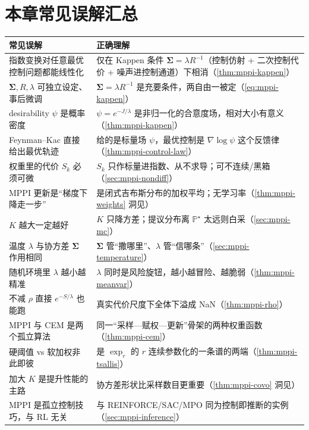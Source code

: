 \section*{本章常见误解汇总}
\begin{table}[H]\centering\small
\begin{tabular}{p{} p{}}
\toprule
\textbf{常见误解} & \textbf{正确理解} \\
\midrule
指数变换对任意最优控制问题都能线性化 & 仅在 Kappen 条件 $\boldsymbol{\Sigma}=\lambda R^{-1}$（控制仿射 + 二次控制代价 + 噪声进控制通道）下相消（\cref{thm:mppi-kappen}）\\
$\boldsymbol{\Sigma},R,\lambda$ 可独立设定、事后微调 & $\boldsymbol{\Sigma}=\lambda R^{-1}$ 是充要条件，两自由一被定（\cref{eq:mppi-kappen}）\\
desirability $\psi$ 是概率密度 & $\psi=e^{-J/\lambda}$ 是非归一化的合意度场，相对大小有意义（\cref{thm:mppi-kappen}）\\
Feynman--Kac 直接给出最优轨迹 & 给的是标量场 $\psi$，最优控制是 $\nabla\log\psi$ 这个反馈律（\cref{thm:mppi-control-law}）\\
权重里的代价 $S_k$ 必须可微 & $S_k$ 只作标量进指数、从不求导；可不连续/黑箱（\cref{sec:mppi-nondiff}）\\
MPPI 更新是“梯度下降走一步” & 是闭式吉布斯分布的加权平均；无学习率（\cref{thm:mppi-weights} 洞见）\\
$K$ 越大一定越好 & $K$ 只降方差；提议分布离 $\mathbb{P}^\star$ 太远则白采（\cref{sec:mppi-mc}）\\
温度 $\lambda$ 与协方差 $\boldsymbol{\Sigma}$ 作用相同 & $\boldsymbol{\Sigma}$ 管“撒哪里”、$\lambda$ 管“信哪条”（\cref{sec:mppi-temperature}）\\
随机环境里 $\lambda$ 越小越精准 & $\lambda$ 同时是风险旋钮，越小越冒险、越脆弱（\cref{thm:mppi-meanvar}）\\
不减 $\rho$ 直接 $e^{-S/\lambda}$ 也能跑 & 真实代价尺度下全体下溢成 NaN（\cref{thm:mppi-rho}）\\
MPPI 与 CEM 是两个孤立算法 & 同一“采样—赋权—更新”骨架的两种权重函数（\cref{thm:mppi-cem}）\\
硬阈值 vs 软加权非此即彼 & 是 $\exp_r$ 的 $r$ 连续参数化的一条谱的两端（\cref{thm:mppi-tsallis}）\\
加大 $K$ 是提升性能的主路 & 协方差形状比采样数目更重要（\cref{thm:mppi-covo} 洞见）\\
MPPI 是孤立控制技巧，与 RL 无关 & 与 REINFORCE/SAC/MPO 同为控制即推断的实例（\cref{sec:mppi-inference}）\\
\bottomrule
\end{tabular}
\end{table}

